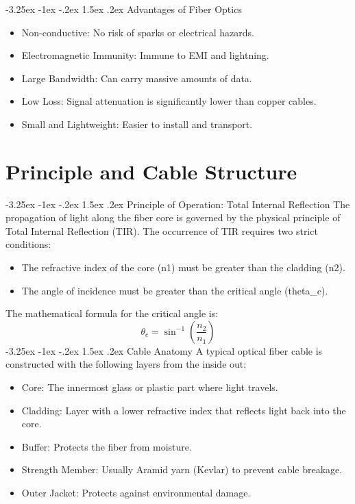 \documentclass[11pt,a4paper]{report}
\makeatletter
\renewcommand{\section}{\@startsection{section}{1}{\z@}%
  {-3.25ex \@plus -1ex \@minus -.2ex}%
  {1.5ex \@plus.2ex}%
  {\normalfont\Large\bfseries\color{primaryColor}}}
\makeatother
\begin{document}
\section{Advantages of Fiber Optics}
\begin{itemize}
  \item Non-conductive: No risk of sparks or electrical hazards.
  \item Electromagnetic Immunity: Immune to EMI and lightning.
  \item Large Bandwidth: Can carry massive amounts of data.
  \item Low Loss: Signal attenuation is significantly lower than copper cables.
  \item Small and Lightweight: Easier to install and transport.
\end{itemize}
\chapter{Principle and Cable Structure}
\section{Principle of Operation: Total Internal Reflection}
The propagation of light along the fiber core is governed by the physical principle of Total Internal Reflection (TIR). The occurrence of TIR requires two strict conditions:
\begin{itemize}
  \item The refractive index of the core (n1) must be greater than the cladding (n2).
  \item The angle of incidence must be greater than the critical angle (theta\_c).
\end{itemize}
The mathematical formula for the critical angle is:
\begin{equation}\theta_c = \sin^{-1}\left( \frac{n_2}{n_1} \right)\end{equation}
\section{Cable Anatomy}
A typical optical fiber cable is constructed with the following layers from the inside out:
\begin{itemize}
  \item Core: The innermost glass or plastic part where light travels.
  \item Cladding: Layer with a lower refractive index that reflects light back into the core.
  \item Buffer: Protects the fiber from moisture.
  \item Strength Member: Usually Aramid yarn (Kevlar) to prevent cable breakage.
  \item Outer Jacket: Protects against environmental damage.
\end{itemize}
\end{document}

